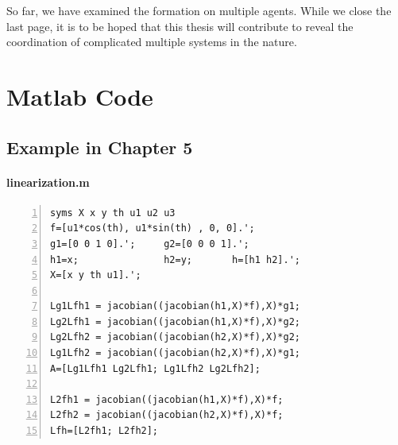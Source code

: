 \documentclass[11pt, a4paper, oneside, openany, reqno]{book}
\theoremstyle{definition}
\theoremstyle{remark}
\numberwithin{equation}{chapter} %
\begin{document}
So far, we have examined the formation on multiple agents. While we close the last page,
it is to be hoped that this thesis will contribute 
to reveal the coordination of complicated multiple systems in the nature.


\appendix
\chapter{Matlab Code}
\section{Example in Chapter 5}

\subsubsection{linearization.m}
\begin{footnotesize}
\begin{Verbatim}[fontfamily=cmtt,baselinestretch=0,numbers=left]
syms X x y th u1 u2 u3 
f=[u1*cos(th), u1*sin(th) , 0, 0].';
g1=[0 0 1 0].';     g2=[0 0 0 1].';
h1=x;               h2=y;       h=[h1 h2].';
X=[x y th u1].';

Lg1Lfh1 = jacobian((jacobian(h1,X)*f),X)*g1;
Lg2Lfh1 = jacobian((jacobian(h1,X)*f),X)*g2;
Lg2Lfh2 = jacobian((jacobian(h2,X)*f),X)*g2;
Lg1Lfh2 = jacobian((jacobian(h2,X)*f),X)*g1;
A=[Lg1Lfh1 Lg2Lfh1; Lg1Lfh2 Lg2Lfh2];

L2fh1 = jacobian((jacobian(h1,X)*f),X)*f;
L2fh2 = jacobian((jacobian(h2,X)*f),X)*f;
Lfh=[L2fh1; L2fh2];
\end{Verbatim}
\end{footnotesize}
\end{document}
